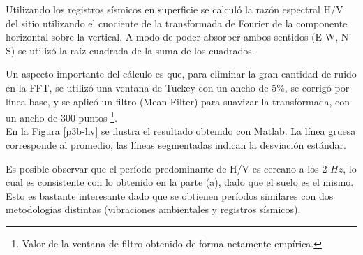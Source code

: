 Utilizando los registros sísmicos en superficie se calculó la razón espectral H/V del sitio utilizando el cuociente de la transformada de Fourier de la componente horizontal sobre la vertical. A modo de poder absorber ambos sentidos (E-W, N-S) se utilizó la raíz cuadrada de la suma de los cuadrados.


Un aspecto importante del cálculo es que, para eliminar la gran cantidad de ruido en la FFT, se utilizó una ventana de Tuckey con un ancho de 5\%, se corrigó por línea base, y se aplicó un filtro (Mean Filter) para suavizar la transformada, con un ancho de 300 puntos \footnote{Valor de la ventana de filtro obtenido de forma netamente empírica.}. \\

En la Figura \ref{p3b-hv} se ilustra el resultado obtenido con Matlab. La línea gruesa corresponde al promedio, las líneas segmentadas indican la desviación estándar.


Es posible observar que el período predominante de H/V es cercano a los 2 $Hz$, lo cual es consistente con lo obtenido en la parte (a), dado que el suelo es el mismo. Esto es bastante interesante dado que se obtienen períodos similares con dos metodologías distintas (vibraciones ambientales y registros sísmicos). 